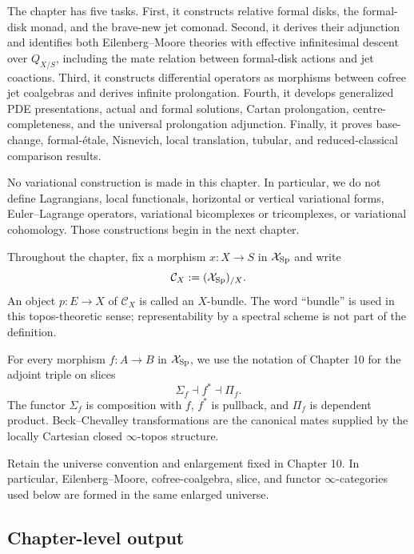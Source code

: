 The chapter has five tasks.  First, it constructs relative formal disks, the formal-disk monad, and the brave-new jet comonad.  Second, it derives their adjunction and identifies both Eilenberg--Moore theories with effective infinitesimal descent over $Q_{X/S}$, including the mate relation between formal-disk actions and jet coactions.  Third, it constructs differential operators as morphisms between cofree jet coalgebras and derives infinite prolongation.  Fourth, it develops generalized PDE presentations, actual and formal solutions, Cartan prolongation, centre-completeness, and the universal prolongation adjunction.  Finally, it proves base-change, formal-\'{e}tale, Nisnevich, local translation, tubular, and reduced-classical comparison results.

No variational construction is made in this chapter.  In particular, we do not define Lagrangians, local functionals, horizontal or vertical variational forms, Euler--Lagrange operators, variational bicomplexes or tricomplexes, or variational cohomology.  Those constructions begin in the next chapter.

\begin{convention}
Throughout the chapter, fix a morphism $x:X\to S$ in $\mathcal{X}_{\mathrm{Sp}}$ and write
\[
    \mathcal C_X:=(\mathcal{X}_{\mathrm{Sp}})_{/X}.
\]
An object $p:E\to X$ of $\mathcal C_X$ is called an $X$-bundle.  The word ``bundle'' is used in this topos-theoretic sense; representability by a spectral scheme is not part of the definition.
\end{convention}

\begin{convention}
For every morphism $f:A\to B$ in $\mathcal{X}_{\mathrm{Sp}}$, we use the notation of Chapter 10 for the adjoint triple on slices
\[
    \Sigma_f\dashv f^*\dashv \Pi_f.
\]
The functor $\Sigma_f$ is composition with $f$, $f^*$ is pullback, and $\Pi_f$ is dependent product.  Beck--Chevalley transformations are the canonical mates supplied by the locally Cartesian closed $\infty$-topos structure.
\end{convention}

\begin{convention}[Universes]
Retain the universe convention and enlargement fixed in Chapter 10.  In particular, Eilenberg--Moore, cofree-coalgebra, slice, and functor $\infty$-categories used below are formed in the same enlarged universe.
\end{convention}

\subsection{Chapter-level output}
\label{subsec:jets-output-preview}

